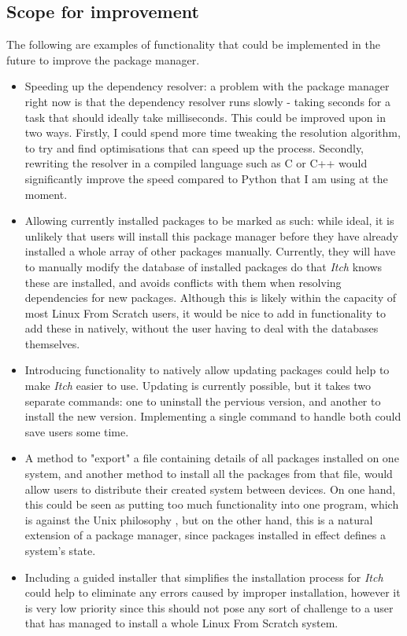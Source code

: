 \documentclass[10pt]{article}
\begin{document}
\subsection{Scope for improvement}

The following are examples of functionality that could be implemented in the future to improve the package manager.
\begin{itemize}
    \item Speeding up the dependency resolver: a problem with the package manager right now is that the dependency resolver runs slowly - taking seconds for a task that should ideally take milliseconds. This could be improved upon in two ways. Firstly, I could spend more time tweaking the resolution algorithm, to try and find optimisations that can speed up the process. Secondly, rewriting the resolver in a compiled language such as C or C++ would significantly improve the speed compared to Python that I am using at the moment.
    \item Allowing currently installed packages to be marked as such: while ideal, it is unlikely that users will install this package manager before they have already installed a whole array of other packages manually. Currently, they will have to manually modify the database of installed packages do that \textit{Itch} knows these are installed, and avoids conflicts with them when resolving dependencies for new packages. Although this is likely within the capacity of most Linux From Scratch users, it would be nice to add in functionality to add these in natively, without the user having to deal with the databases themselves.
    \item Introducing functionality to natively allow updating packages could help to make \textit{Itch} easier to use. Updating is currently possible, but it takes two separate commands: one to uninstall the pervious version, and another to install the new version. Implementing a single command to handle both could save users some time.
    \item A method to "export" a file containing details of all packages installed on one system, and another method to install all the packages from that file, would allow users to distribute their created system between devices. On one hand, this could be seen as putting too much functionality into one program, which is against the Unix philosophy \cite{UnixPhilosophy}, but on the other hand, this is a natural extension of a package manager, since packages installed in effect defines a system's state.
    \item Including a guided installer that simplifies the installation process for \textit{Itch} could help to eliminate any errors caused by improper installation, however it is very low priority since this should not pose any sort of challenge to a user that has managed to install a whole Linux From Scratch system.
\end{itemize}
\end{document}
